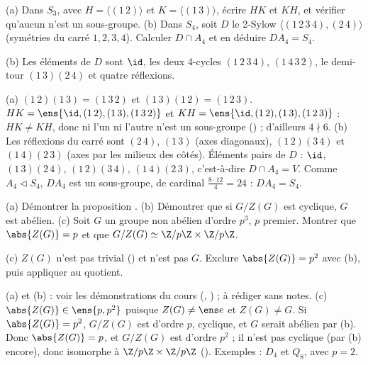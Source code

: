 \begin{exo}
(a) Dans $S_3$, avec $H=\langle(1\,2)\rangle$ et $K=\langle(1\,3)\rangle$, écrire $HK$ et $KH$, et vérifier qu'aucun n'est un sous-groupe. (b) Dans $S_4$, soit $D$ le 2-Sylow $\langle(1\,2\,3\,4),(2\,4)\rangle$ (symétries du carré $1,2,3,4$). Calculer $D\cap A_4$ et en déduire $DA_4=S_4$.
\begin{indication}
(b) Les éléments de $D$ sont $\id$, les deux 4-cycles $(1\,2\,3\,4)$, $(1\,4\,3\,2)$, le demi-tour $(1\,3)(2\,4)$ et quatre réflexions.
\end{indication}
\begin{corrige}
(a) $(1\,2)(1\,3)=(1\,3\,2)$ et $(1\,3)(1\,2)=(1\,2\,3)$. $HK=\ens{\id,(1\,2),(1\,3),(1\,3\,2)}$ et $KH=\ens{\id,(1\,2),(1\,3),(1\,2\,3)}$ : $HK\neq KH$, donc ni l'un ni l'autre n'est un sous-groupe () ; d'ailleurs $4\nmid6$.
(b) Les réflexions du carré sont $(2\,4)$, $(1\,3)$ (axes diagonaux), $(1\,2)(3\,4)$ et $(1\,4)(2\,3)$ (axes par les milieux des côtés). Éléments pairs de $D$ : $\id$, $(1\,3)(2\,4)$, $(1\,2)(3\,4)$, $(1\,4)(2\,3)$, c'est-à-dire $D\cap A_4=V$. Comme $A_4\lhd S_4$, $DA_4$ est un sous-groupe, de cardinal $\frac{8\cdot12}4=24$ : $DA_4=S_4$.
\end{corrige}
\end{exo}

\begin{exo}
(a) Démontrer la proposition . (b) Démontrer que si $G/Z(G)$ est cyclique, $G$ est abélien. (c) Soit $G$ un groupe non abélien d'ordre $p^3$, $p$ premier. Montrer que $\abs{Z(G)}=p$ et que $G/Z(G)\simeq\Z/p\Z\times\Z/p\Z$.
\begin{indication}
(c) $Z(G)$ n'est pas trivial () et n'est pas $G$. Exclure $\abs{Z(G)}=p^2$ avec (b), puis appliquer  au quotient.
\end{indication}
\begin{corrige}
(a) et (b) : voir les démonstrations du cours (, ) ; à rédiger sans notes.
(c) $\abs{Z(G)}\in\ens{p,p^2}$ puisque $Z(G)\neq\ens e$ et $Z(G)\neq G$. Si $\abs{Z(G)}=p^2$, $G/Z(G)$ est d'ordre $p$, cyclique, et $G$ serait abélien par (b). Donc $\abs{Z(G)}=p$, et $G/Z(G)$ est d'ordre $p^2$ ; il n'est pas cyclique (par (b) encore), donc isomorphe à $\Z/p\Z\times\Z/p\Z$ (). Exemples : $D_4$ et $Q_8$, avec $p=2$.
\end{corrige}
\end{exo}

